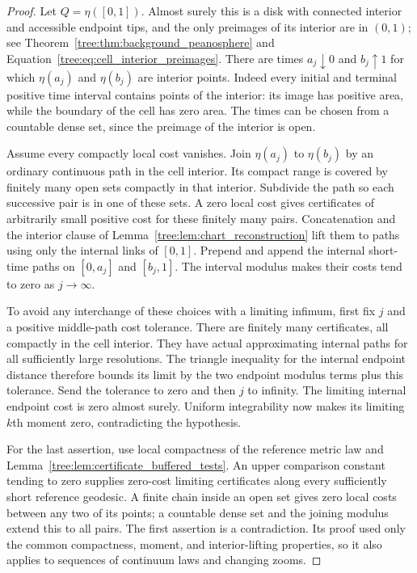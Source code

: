 \begin{proof}
Let $Q=\eta([0,1])$.  Almost surely this is a disk with connected
interior and accessible endpoint tips, and the only preimages of
its interior are in $(0,1)$; see
Theorem~\ref{tree:thm:background_peanosphere} and
Equation~\eqref{tree:eq:cell_interior_preimages}.  There are times
$a_j\downarrow0$ and $b_j\uparrow1$ for which $\eta(a_j)$ and
$\eta(b_j)$ are interior points.  Indeed every initial and terminal
positive time interval contains points of the interior: its image
has positive area, while the boundary of the cell has zero area.
The times can be chosen from a countable dense set, since the
preimage of the interior is open.

Assume every compactly local cost vanishes.  Join $\eta(a_j)$ to
$\eta(b_j)$ by an ordinary continuous path in the cell interior.
Its compact range is covered by finitely many open sets compactly
in that interior.  Subdivide the path so each successive pair is
in one of these sets.  A zero local cost gives certificates of
arbitrarily small positive cost for these finitely many pairs.
Concatenation and the interior clause of
Lemma~\ref{tree:lem:chart_reconstruction} lift them to paths using only
the internal links of $[0,1]$.  Prepend and append the internal
short-time paths on $[0,a_j]$ and $[b_j,1]$.  The interval modulus
makes their costs tend to zero as $j\to\infty$.

To avoid any interchange of these choices with a limiting infimum,
first fix $j$ and a positive middle-path cost tolerance.  There
are finitely many certificates, all compactly in the cell interior.
They have actual approximating internal paths for all sufficiently
large resolutions.  The triangle inequality for the internal
endpoint distance therefore bounds its limit by the two endpoint
modulus terms plus this tolerance.  Send the tolerance to zero
and then $j$ to infinity.  The limiting internal endpoint cost is
zero almost surely.  Uniform integrability now makes its limiting
$k$th moment zero, contradicting the hypothesis.

For the last assertion, use local compactness of the reference
metric law and Lemma~\ref{tree:lem:certificate_buffered_tests}.  An upper
comparison constant tending to zero supplies zero-cost limiting
certificates along every sufficiently short reference geodesic.
A finite chain inside an open set gives zero local costs between
any two of its points; a countable dense set and the joining
modulus extend this to all pairs.  The first assertion is a
contradiction.  Its proof used only the common compactness, moment,
and interior-lifting properties, so it also applies to sequences
of continuum laws and changing zooms.
\end{proof}

